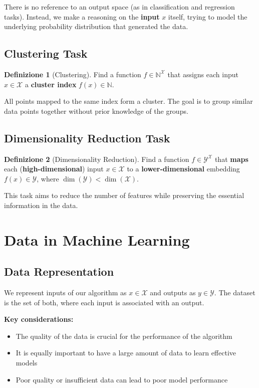 \documentclass[11pt,a4paper]{article}
\theoremstyle{definition}
\newtheorem{definition}{Definizione}[section]
\theoremstyle{plain}
\theoremstyle{remark}
\begin{document}
There is no reference to an output space (as in classification and regression tasks). Instead, we make a reasoning on the \textbf{input} $x$ itself, trying to model the underlying probability distribution that generated the data.

\subsection{Clustering Task}

\begin{definition}[Clustering]
Find a function $f \in \mathbb{N}^{\mathcal{X}}$ that assigns each input $x \in \mathcal{X}$ a \textbf{cluster index} $f(x) \in \mathbb{N}$.
\end{definition}

All points mapped to the same index form a cluster. The goal is to group similar data points together without prior knowledge of the groups.

\subsection{Dimensionality Reduction Task}

\begin{definition}[Dimensionality Reduction]
Find a function $f \in \mathcal{Y}^{\mathcal{X}}$ that \textbf{maps} each (\textbf{high-dimensional}) input $x \in \mathcal{X}$ to a \textbf{lower-dimensional} embedding $f(x) \in \mathcal{Y}$, where $\dim(\mathcal{Y}) < \dim(\mathcal{X})$.
\end{definition}

This task aims to reduce the number of features while preserving the essential information in the data.

\section{Data in Machine Learning}

\subsection{Data Representation}

We represent inputs of our algorithm as $x \in \mathcal{X}$ and outputs as $y \in \mathcal{Y}$. The dataset is the set of both, where each input is associated with an output.

\textbf{Key considerations:}
\begin{itemize}
    \item The quality of the data is crucial for the performance of the algorithm
    \item It is equally important to have a large amount of data to learn effective models
    \item Poor quality or insufficient data can lead to poor model performance
\end{itemize}
\end{document}
